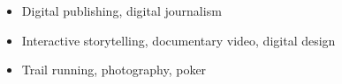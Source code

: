 \documentclass[a4paper,12pt]{memoir} %
\begin{document}




\begin{itemize}
	\item Digital publishing, digital journalism 
	\item Interactive storytelling, documentary video, digital design
	\item Trail running, photography, poker
\end{itemize}

\Sep %

\end{document}
